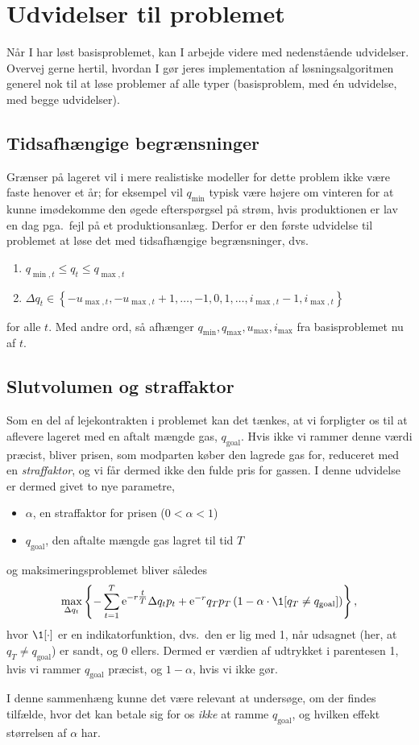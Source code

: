 \section{Udvidelser til problemet}
\label{sec:extensions}
Når I har løst basisproblemet, kan I arbejde videre med nedenstående udvidelser.
Overvej gerne hertil, hvordan I gør jeres implementation af løsningsalgoritmen generel nok til at løse problemer af alle typer (basisproblem, med én udvidelse, med begge udvidelser).

\subsection{Tidsafhængige begrænsninger}
\label{subsec:timdep}
Grænser på lageret vil i mere realistiske modeller for dette problem ikke være faste henover et år;
for eksempel vil \(q_{\min}\) typisk være højere om vinteren for at kunne imødekomme den øgede efterspørgsel på strøm, hvis produktionen er lav en dag pga.\ fejl på et produktionsanlæg.
Derfor er den første udvidelse til problemet at løse det med tidsafhængige begrænsninger, dvs.\
\begin{enumerate}
\item \(q_{\min,t} \leq q_{t} \leq q_{\max,t}\)
\item \(\Delta q_{t} \in
    \left\{
    -u_{\max,t} , -u_{\max,t}+1 , \dotsc, -1, 0, 1, \dotsc, i_{\max,t} - 1 , i_{\max,t}
    \right\}\)
\end{enumerate}
for alle \(t\).
Med andre ord, så afhænger \(q_{\min}, q_{\max}, u_{\max}, i_{\max}\) fra basisproblemet nu af \(t\).

\subsection{Slutvolumen og straffaktor}
\label{subsec:penalty}
Som en del af lejekontrakten i problemet kan det tænkes, at vi forpligter os til at aflevere lageret med en aftalt mængde gas, \(q_{\mathrm{goal}}\).
Hvis ikke vi rammer denne værdi præcist, bliver prisen, som modparten køber den lagrede gas for, reduceret med en \emph{straffaktor}, og vi får dermed ikke den fulde pris for gassen.
I denne udvidelse er dermed givet to nye parametre,
\begin{itemize}
\item \(\alpha\), en straffaktor for prisen (\(0 < \alpha < 1\))
\item \(q_{\mathrm{goal}}\), den aftalte mængde gas lagret til tid \(T\)
\end{itemize}
og maksimeringsproblemet bliver således
\begin{equation}
  \max_{\Delta q_{t}}
  \left\{
    - \sum_{t = 1}^{T} \e^{-r\tfrac{t}{T}} \Delta q_{t} p_{t} + \e^{-r} q_{T}p_{T}
    \left(
      1 - \alpha \cdot \1 [q_{T} \neq q_{\mathrm{goal}}]
    \right)
  \right\} ,
\end{equation}
hvor \(\1[\cdot]\) er en indikatorfunktion, dvs.\ den er lig med 1, når udsagnet (her, at \(q_{T} \neq q_{\mathrm{goal}}\)) er sandt, og 0 ellers.
Dermed er værdien af udtrykket i parentesen 1, hvis vi rammer \(q_{\mathrm{goal}}\) præcist, og \(1 - \alpha\), hvis vi ikke gør.

I denne sammenhæng kunne det være relevant at undersøge, om der findes tilfælde, hvor det kan betale sig for os \emph{ikke} at ramme \(q_{\mathrm{goal}}\), og hvilken effekt størrelsen af \(\alpha\) har.
